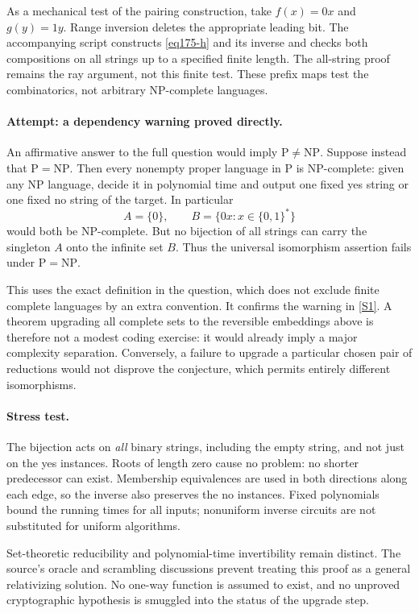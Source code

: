 \documentclass[11pt,a4paper]{article}
\newcommand{\sref}[2]{\hyperlink{source:#1:#2}{[S#2]}}
\numberwithin{equation}{section}
\begin{document}
As a mechanical test of the pairing construction, take $f(x)=0x$ and
$g(y)=1y$. Range inversion deletes the appropriate leading bit. The
accompanying script constructs \eqref{eq175-h} and its inverse and checks
both compositions on all strings up to a specified finite length. The
all-string proof remains the ray argument, not this finite test. These
prefix maps test the combinatorics, not arbitrary NP-complete languages.

\paragraph{Attempt: a dependency warning proved directly.}
An affirmative answer to the full question would imply
$\mathrm P\ne\mathrm{NP}$. Suppose instead that $\mathrm P=\mathrm{NP}$.
Then every nonempty proper language in $\mathrm P$ is NP-complete: given
any NP language, decide it in polynomial time and output one fixed yes
string or one fixed no string of the target. In particular
\[
 A=\{0\},\qquad B=\{0x:x\in\{0,1\}^*\}
\]
would both be NP-complete. But no bijection of all strings can carry the
singleton $A$ onto the infinite set $B$. Thus the universal isomorphism
assertion fails under $\mathrm P=\mathrm{NP}$.

This uses the exact definition in the question, which does not exclude
finite complete languages by an extra convention. It confirms the
warning in \sref{175}{1}. A theorem upgrading all complete sets to the
reversible embeddings above is therefore not a modest coding exercise:
it would already imply a major complexity separation. Conversely, a
failure to upgrade a particular chosen pair of reductions would not
disprove the conjecture, which permits entirely different isomorphisms.

\paragraph{Stress test.}
The bijection acts on \emph{all} binary strings, including the empty string,
and not just on the yes instances. Roots of length zero cause no problem:
no shorter predecessor can exist. Membership equivalences are used in
both directions along each edge, so the inverse also preserves the no
instances. Fixed polynomials bound the running times for all inputs;
nonuniform inverse circuits are not substituted for uniform algorithms.

Set-theoretic reducibility and polynomial-time invertibility remain distinct.
The source's oracle and scrambling discussions prevent treating this proof
as a general relativizing solution. No one-way function is assumed to exist,
and no unproved cryptographic hypothesis is smuggled into the status of
the upgrade step.
\end{document}
